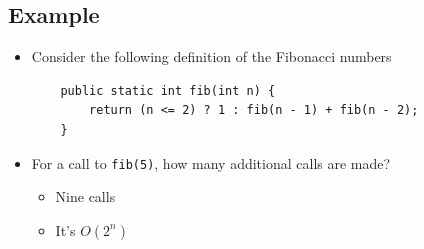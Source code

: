 \documentclass[10pt]{article}
\begin{document}
\subsection*{Example}
\begin{itemize}
    \item Consider the following definition of the Fibonacci numbers
\begin{verbatim}
    public static int fib(int n) {
        return (n <= 2) ? 1 : fib(n - 1) + fib(n - 2);
    }
\end{verbatim}
    \item For a call to \texttt{fib(5)}, how many additional calls are made?
    \begin{itemize}
        \item Nine calls
        \item It's $O(2^n)$
    \end{itemize}
\end{itemize}
\end{document}
